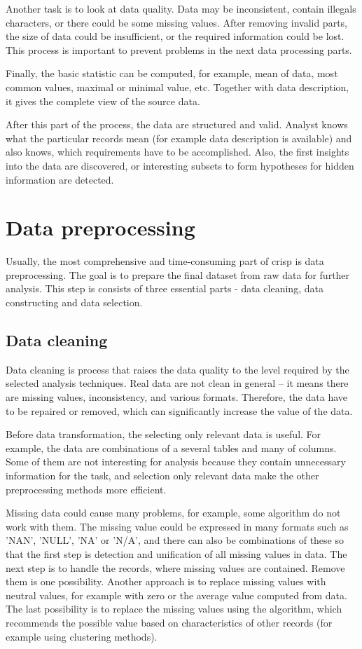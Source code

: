 \documentclass[thesis=M,english]{FITthesis}[2012/10/20]
\begin{document}
Another task is to look at data quality. Data may be inconsistent, contain illegals characters, or there could be some missing values. After removing invalid parts, the size of data could be insufficient, or the required information could be lost. This process is important to prevent problems in the next data processing parts.

Finally, the basic statistic can be computed, for example, mean of data, most common values, maximal or minimal value, etc. Together with data description, it gives the complete view of the source data. 

After this part of the process, the data are structured and valid. Analyst knows what the particular records mean (for example data description is available) and also knows, which requirements have to be accomplished. Also, the first insights into the data are discovered, or interesting subsets to form hypotheses for hidden information are detected.

\section{Data preprocessing}

Usually, the most comprehensive and time-consuming part of \gls{crisp} is data preprocessing. The goal is to prepare the final dataset from raw data for further analysis. This step is consists of three essential parts - data cleaning, data constructing and data selection.

\subsection{Data cleaning}

Data cleaning is process that raises the data quality to the level required by the selected analysis techniques.\cite[21]{Chapman2000crisp} Real data are not clean in general -- it means there are missing values, inconsistency, and various formats. Therefore, the data have to be repaired or removed, which can significantly increase the value of the data. 

Before data transformation, the selecting only relevant data is useful. For example, the data are combinations of a several tables and many of columns. Some of them are not interesting for analysis because they contain unnecessary information for the task, and selection only relevant data make the other preprocessing methods more efficient. 

Missing data could cause many problems, for example, some algorithm do not work with them.\cite[43]{Chapman2000crisp} The missing value could be expressed in many formats such as 'NAN', 'NULL', 'NA' or 'N/A', and there can also be combinations of these so that the first step is detection and unification of all missing values in data. The next step is to handle the records, where missing values are contained. Remove them is one possibility. Another approach is to replace missing values with neutral values, for example with zero or the average value computed from data. The last possibility is to replace the missing values using the algorithm, which recommends the possible value based on characteristics of other records (for example using clustering methods).
\end{document}
